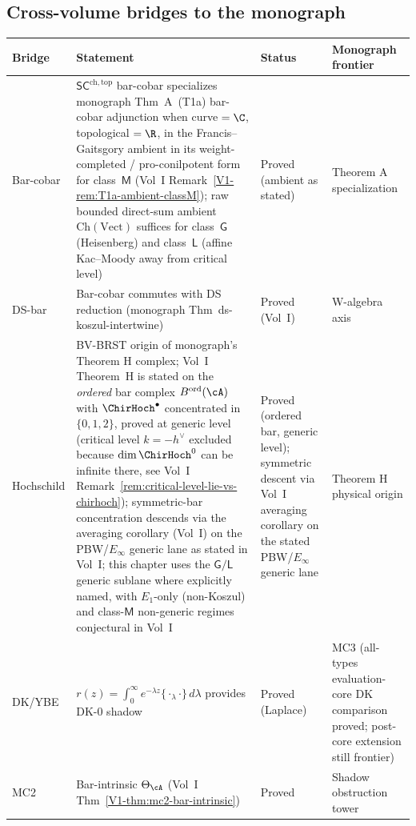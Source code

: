 \subsection{Cross-volume bridges to the monograph}

\begin{center}
\renewcommand{\arraystretch}{1.3}
\begin{tabular}{p{}p{}p{}p{}}
\textbf{Bridge} & \textbf{Statement} & \textbf{Status} & \textbf{Monograph frontier} \\
\hline
Bar-cobar & $\mathsf{SC}^{\mathrm{ch,top}}$ bar-cobar specializes monograph Thm~A~(T1a) bar-cobar adjunction when curve${}=\C$, topological${}=\R$, in the Francis--Gaitsgory ambient in its weight-completed / pro-conilpotent form for class~$\mathsf{M}$ (Vol~I Remark~\ref*{V1-rem:T1a-ambient-classM}); raw bounded direct-sum ambient $\mathrm{Ch}(\mathrm{Vect})$ suffices for class~$\mathsf{G}$ (Heisenberg) and class~$\mathsf{L}$ (affine Kac--Moody away from critical level) & Proved (ambient as stated) & Theorem A specialization \\
DS-bar & Bar-cobar commutes with DS reduction (monograph Thm~ds-koszul-intertwine) & Proved (Vol~I) & W-algebra axis \\
Hochschild & BV-BRST origin of monograph's Theorem H complex; Vol~I Theorem~H is stated on the \emph{ordered} bar complex $B^{\mathrm{ord}}(\cA)$ with $\ChirHoch^\bullet$ concentrated in $\{0,1,2\}$, proved at generic level (critical level $k=-h^\vee$ excluded because $\dim \ChirHoch^0$ can be infinite there, see Vol~I Remark~\ref*{rem:critical-level-lie-vs-chirhoch}); symmetric-bar concentration descends via the averaging corollary (Vol~I) on the PBW/$E_\infty$ generic lane as stated in Vol~I; this chapter uses the $\mathsf{G}/\mathsf{L}$ generic sublane where explicitly named, with $E_1$-only (non-Koszul) and class-$\mathsf{M}$ non-generic regimes conjectural in Vol~I & Proved (ordered bar, generic level); symmetric descent via Vol~I averaging corollary on the stated PBW/$E_\infty$ generic lane & Theorem H physical origin \\
DK/YBE & $r(z) = \int_0^\infty e^{-\lambda z}\{\cdot_\lambda\cdot\}\,d\lambda$ provides DK-0 shadow & Proved (Laplace) & MC3 (all-types evaluation-core DK comparison proved; post-core extension still frontier) \\
MC2 & Bar-intrinsic $\Theta_\cA$ (Vol~I Thm~\ref*{V1-thm:mc2-bar-intrinsic}) & Proved & Shadow obstruction tower \\

\end{tabular}
\end{center}
